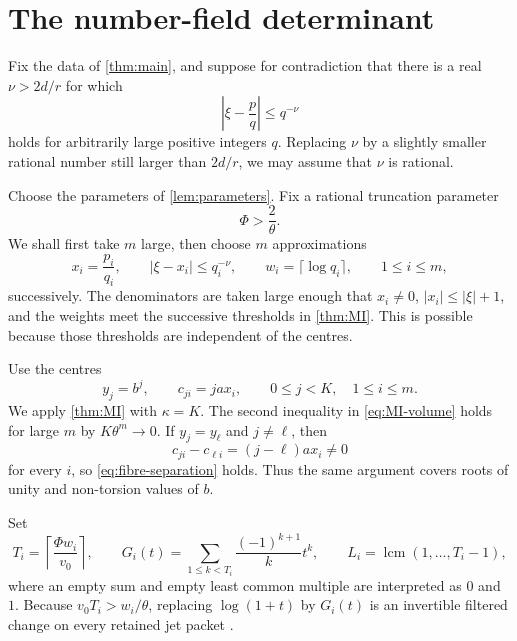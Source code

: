 \documentclass[11pt]{article}
\DeclareMathOperator{\lcm}{lcm}
\theoremstyle{definition}
\theoremstyle{remark}
\numberwithin{equation}{section}
\begin{document}
\section{The number-field determinant}\label{sec:determinant}

Fix the data of \cref{thm:main}, and suppose for contradiction that
there is a real $\nu>2d/r$ for which
\begin{equation}\label{eq:good-approximations}
 \left|\xi-\frac pq\right|\le q^{-\nu}
\end{equation}
holds for arbitrarily large positive integers $q$.  Replacing $\nu$ by
a slightly smaller rational number still larger than $2d/r$, we may
assume that $\nu$ is rational.

Choose the parameters of \cref{lem:parameters}.  Fix a rational
truncation parameter
\begin{equation}\label{eq:Phi}
 \Phi>\frac2\theta.
\end{equation}
We shall first take $m$ large, then choose $m$ approximations
\[
 x_i=\frac{p_i}{q_i},\qquad
 \left|\xi-x_i\right|\le q_i^{-\nu},
 \qquad w_i=\lceil\log q_i\rceil,
 \qquad 1\le i\le m,
\]
successively.  The denominators are taken large enough that $x_i\ne0$,
$|x_i|\le|\xi|+1$, and the weights meet the successive thresholds in
\cref{thm:MI}.  This is possible because those thresholds are
independent of the centres.

Use the centres
\begin{equation}\label{eq:centres}
 y_j=b^j,\qquad c_{ji}=ja x_i,
 \qquad 0\le j<K,\quad1\le i\le m.
\end{equation}
We apply \cref{thm:MI} with $\kappa=K$.  The second inequality in
\eqref{eq:MI-volume} holds for large $m$ by $K\theta^m\to0$.  If
$y_j=y_\ell$ and $j\ne\ell$, then
\[
 c_{ji}-c_{\ell i}=(j-\ell)a x_i\ne0
\]
for every $i$, so \eqref{eq:fibre-separation} holds.  Thus the same
argument covers roots of unity and non-torsion values of $b$.

Set
\begin{equation}\label{eq:truncations}
 T_i=\left\lceil\frac{\Phi w_i}{v_0}\right\rceil,
 \qquad
 G_i(t)=\sum_{1\le k<T_i}\frac{(-1)^{k+1}}{k}t^k,
 \qquad
 L_i=\lcm(1,\ldots,T_i-1),
\end{equation}
where an empty sum and empty least common multiple are interpreted as
$0$ and $1$.  Because $v_0T_i>w_i/\theta$, replacing $\log(1+t)$ by
$G_i(t)$ is an invertible filtered change on every retained jet packet
\cite[Section~4]{LiuJiangZhang2026}.
\end{document}
